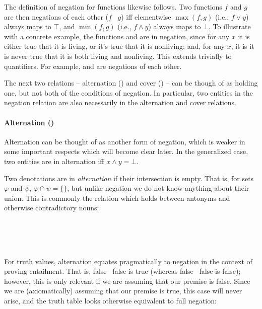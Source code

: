 The definition of negation for functions likewise follows.
Two functions $f$ and $g$ are then negations of each other ($f$ \negate\ $g$)
  iff elementwise $\max(f, g)$ (i.e., $f \lor y$) always maps to $\top$, 
  and $\min(f, g)$ (i.e., $f \land y$) always maps to $\bot$.
To illustrate with a concrete example, the functions  and
   are in negation, since for any $x$ it is either true that
  it is living, or it's true that it is nonliving; and, for any $x$, it is
  it is never true that it is both living and nonliving.
This extends trivially to quantifiers.
For example,  and  are negations of each other.


The next two relations -- alternation (\alternate) and cover (\cover) -- can be
  though of as holding one, but not both of the conditions of negation.
In particular, two entities in the negation relation are also necessarily in the
  alternation and cover relations.


\paragraph{Alternation (\alternate)}
Alternation can be thought of as another form of negation, which is weaker in
  some important respects which will become clear later.
In the generalized case, two entities are in alternation iff $x \land y = \bot$.

Two denotations are in \textit{alternation} if their intersection is empty.
That is, for sets $\varphi$ and $\psi$, $\varphi \cap \psi = \{\}$,
  but unlike negation we do not know anything about their union.
This is commonly the relation which holds between antonyms and otherwise
  contradictory nouns:

\begin{lquote}
 \alternate\  \\
 \alternate\  \\
 \alternate\  \\
\end{lquote}


For truth values, alternation equates pragmatically to negation in the context of
  proving entailment.
That is, false \alternate\ false is true (whereas false \negate\ false is false);
  however, this is only relevant if we are assuming that our premise is false.
Since we are (axiomatically) assuming that our premise is true, this case will never
  arise, and the truth table looks otherwise equivalent to full negation:
 

